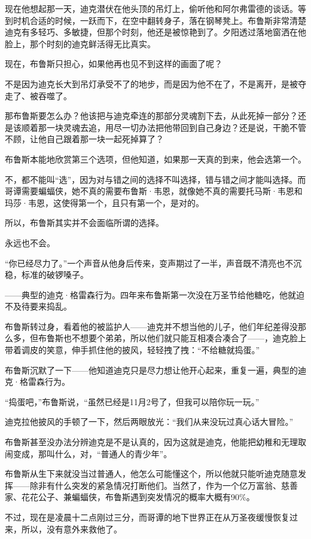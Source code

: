 \documentclass[../main]{subfiles}
\begin{document}
现在他想起那一天，迪克潜伏在他头顶的吊灯上，偷听他和阿尔弗雷德的谈话。等到时机合适的时候，一跃而下，在空中翻转身子，落在钢琴凳上。布鲁斯非常清楚迪克有多轻巧、多敏捷，但那个时刻，他还是被惊艳到了。夕阳透过落地窗洒在他脸上，那个时刻的迪克鲜活得无比真实。

现在，布鲁斯只担心，如果他再也见不到这样的画面了呢？

不是因为迪克长大到吊灯承受不了的地步，而是因为他不在了，不是离开，是被夺走了、被吞噬了。

那布鲁斯要怎么办？他该把与迪克牵连的那部分灵魂割下去，从此死掉一部分？还是该顺着那一块灵魂去追，用尽一切办法把他带回到自己身边？还是说，干脆不管不顾，让他自己跟着那一块一起死掉算了？

布鲁斯本能地欣赏第三个选项，但他知道，如果那一天真的到来，他会选第一个。

不，都不能叫“选”，因为对与错之间的选择不叫选择，错与错之间才能叫选择。而哥谭需要蝙蝠侠，她不真的需要布鲁斯·韦恩，就像她不真的需要托马斯·韦恩和玛莎·韦恩，这使得第一个，且只有第一个，是对的。

所以，布鲁斯其实并不会面临所谓的选择。

永远也不会。

“你已经尽力了。”一个声音从他身后传来，变声期过了一半，声音既不清亮也不沉稳，标准的破锣嗓子。

——典型的迪克·格雷森行为。四年来布鲁斯第一次没在万圣节给他糖吃，他就迫不及待要来捣乱。

布鲁斯转过身，看着他的被监护人——迪克并不想当他的儿子，他们年纪差得没那么多，但布鲁斯也不想要个弟弟，所以他们就只能互相凑合凑合了——，迪克脸上带着调皮的笑意，伸手抓住他的披风，轻轻拽了拽：“不给糖就捣蛋。”

布鲁斯沉默了一下——他知道迪克只是尽力想让他开心起来，重复一遍，典型的迪克·格雷森行为。

“捣蛋吧，”布鲁斯说，“虽然已经是11月2号了，但我可以陪你玩一玩。”

迪克拉他披风的手顿了一下，然后两眼放光：“我们从来没玩过真心话大冒险。”

布鲁斯甚至没办法分辨迪克是不是认真的，因为这就是迪克，他能把幼稚和无理取闹变成，那叫什么，对，“普通人的青少年”。

布鲁斯从生下来就没当过普通人，他怎么可能懂这个，所以他就只能听迪克随意发挥——除非有什么突发的紧急情况打断他们。当然了，作为一个亿万富翁、慈善家、花花公子、兼蝙蝠侠，布鲁斯遇到突发情况的概率大概有90\%。

不过，现在是凌晨十二点刚过三分，而哥谭的地下世界正在从万圣夜缓慢恢复过来，所以，没有意外来救他了。
\end{document}
